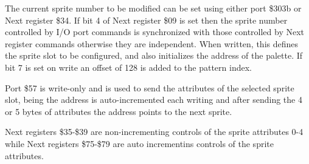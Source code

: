 The current sprite number to be modified can be set using either port
\$303b or Next register \$34. If bit 4 of Next register \$09 is set
then the sprite number controlled by I/O port commands is synchronized
with those controlled by Next register commands otherwise they are
independent. When written, this defines the sprite slot to be
configured, and also initializes the address of the palette. If bit 7
is set on write an offset of 128 is added to the pattern index.

Port \$57 is write-only and is used to send the attributes of the
selected sprite slot, being the address is auto-incremented each
writing and after sending the 4 or 5 bytes of attributes the address
points to the next sprite.

Next registers \$35-\$39 are non-incrementing controls of the sprite
attributes 0-4 while Next registers \$75-\$79 are auto incrementins
controls of the sprite attributes.

